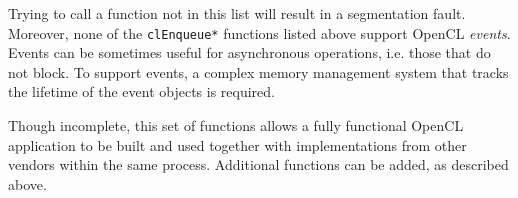 Trying to call a function not in this list will result in a segmentation fault.
Moreover, none of the \texttt{clEnqueue*} functions listed above support OpenCL \emph{events}.
Events can be sometimes useful for asynchronous operations, i.e. those that do not block.
To support events, a complex memory management system that tracks the lifetime of the event objects is required.%


Though incomplete, this set of functions allows a fully functional OpenCL application to be built and used together with implementations from other vendors within the same process.
Additional functions can be added, as described above.

